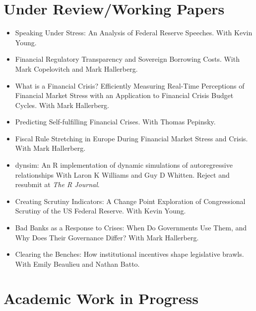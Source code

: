 \documentclass[a4paper]{article}
\begin{document}
{\section*{Under Review/Working Papers}

\begin{itemize}

    \item Speaking Under Stress: An Analysis of Federal Reserve Speeches. With Kevin Young.

    \item Financial Regulatory Transparency and Sovereign Borrowing Costs. With Mark Copelovitch and Mark Hallerberg.

    \item What is a Financial Crisis? Efficiently Measuring Real-Time Perceptions of Financial Market Stress with an Application to Financial Crisis Budget Cycles. With Mark Hallerberg.

    \item Predicting Self-fulfilling Financial Crises. With Thomas Pepinsky.

    \item Fiscal Rule Stretching in Europe During Financial Market Stress and Crisis. With Mark Hallerberg.

    \item dynsim: An R implementation of dynamic simulations of autoregressive relationships With Laron K Williams and Guy D Whitten. Reject and resubmit at \emph{The R Journal}.

    \item Creating Scrutiny Indicators: A Change Point Exploration of Congressional Scrutiny of the US Federal Reserve. With Kevin Young.

    \item Bad Banks as a Response to Crises: When Do Governments Use Them, and Why Does Their Governance Differ? With Mark Hallerberg.

    \item Clearing the Benches: How institutional incentives shape legislative brawls. With Emily Beaulieu and Nathan Batto.

\end{itemize}

\section*{Academic Work in Progress}

\begin{itemize}


\end{itemize}}
\end{document}

